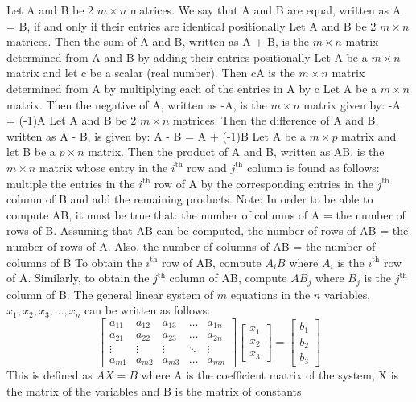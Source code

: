 \documentclass[12pt]{article}
\begin{document}
 Let A and B be 2 $m \times n$ matrices. We say that A and B are equal, written as A = B, if and only if their entries are identical positionally \newline
 Let A and B be 2 $m \times n$ matrices. Then the sum of A and B, written as A + B, is the $m \times n$ matrix determined from A and B by adding their entries positionally \newline
 Let A be a $m \times n$ matrix and let c be a scalar (real number). Then cA is the $m \times n$ matrix determined from A by multiplying each of the entries in A by c \newline
 Let A be a $m \times n$ matrix. Then the negative of A, written as -A, is the $m \times n$ matrix given by: -A = (-1)A \newline
 Let A and B be 2 $m \times n$ matrices. Then the difference of A and B, written as A - B, is given by: A - B = A + (-1)B \newline
 Let A be a $m \times p$ matrix and let B be a $ p \times n$ matrix. Then the product of A and B, written as AB, is the $m \times n$ matrix whose entry in the $i^\text{th}$ row and $j^{\text{th}}$ column is found as follows: multiple the entries in the $i^\text{th}$ row of A by the corresponding entries in the $j^{\text{th}}$ column of B and add the remaining products. Note: In order to be able to compute AB, it must be true that: the number of columns of A = the number of rows of B. \newline
 Assuming that AB can be computed, the number of rows of AB = the number of rows of A. Also, the number of columns of AB = the number of columns of B \newline
 To obtain the $i^\text{th}$ row of AB, compute $A_iB$ where $A_i$ is the $i^\text{th}$ row of A. Similarly, to obtain the $j^\text{th}$ column of AB, compute $AB_j$ where $B_j$ is the $j^\text{th}$ column of B. \newline
 The general linear system of $m$ equations in the $n$ variables, $x_1, x_2, x_3, \dots, x_n$ can be written as follows: \newline $$
 \begin{bmatrix} a_{11} & a_{12} & a_{13} & \dots & a_{1n} \\  a_{21} & a_{22} & a_{23} & \dots & a_{2n} \\ \vdots & \vdots & \vdots & \ddots & \vdots \\  a_{m1} & a_{m2} & a_{m3} & \dots & a_{mn} \end{bmatrix} \begin{bmatrix} x_1 \\ x_2 \\ x_3 \end{bmatrix} = \begin{bmatrix} b_1 \\ b_2 \\ b_3 \end{bmatrix}  $$
 This is defined as $AX = B$ where A is the coefficient matrix of the system, X is the matrix of the variables and B is the matrix of constants \newline
 
\end{document}
